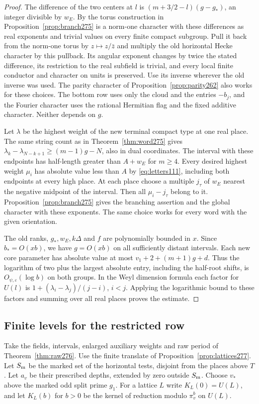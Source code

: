 \documentclass[a4paper,11pt]{article}
\theoremstyle{definition}
\theoremstyle{remark}
\numberwithin{equation}{section}
\begin{document}
\begin{proof}
The difference of the two centers at \(l\) is
\((m+3/2-l)(g-g_*)\), an integer divisible by \(w_E\).
By the torus construction in Proposition~\ref{prop:branch275} is a norm-one character with these differences as real
exponents and trivial values on every finite compact subgroup.
Pull it back from the norm-one torus by \(z\mapsto z/\bar z\)
and multiply the old horizontal Hecke character by this
pullback. Its angular exponent changes by twice the stated
difference, its restriction to the real subfield is trivial,
and every local finite conductor and character on units
is preserved. Use its inverse wherever the old inverse was
used. The parity character of Proposition~\ref{prop:parity262}
also works for these choices. The bottom row uses only the
cloud and the entries \(-b_j\), and the Fourier character
uses the rational Hermitian flag and the fixed additive
character. Neither depends on \(g\).

Let \(\lambda\) be the highest weight of the new terminal
compact type at one real place. The same string count as in
Theorem~\ref{thm:word275} gives
\(\lambda_k-\lambda_{N-k+1}\ge (m-1)g-N\), also in dual
coordinates. The interval with these endpoints has half-length
greater than \(A+w_E\) for \(m\ge4\). Every desired highest
weight \(\mu_i\) has absolute value less than \(A\) by
\eqref{eq:letters111}, including both endpoints at every high
place. At each place choose a multiple \(j_\tau\) of \(w_E\)
nearest the negative midpoint of the interval. Then all
\(\mu_i-j_\tau\) belong to it. Proposition~\ref{prop:branch275}
gives the branching assertion and the global character with
these exponents. The same choice works for every word with
the given orientation.

The old ranks, \(g_*,w_E,k\Delta\) and \(f\) are polynomially
bounded in \(x\). Since \(b_*=O(xb)\), we have \(g=O(xb)\)
on all sufficiently distant intervals. Each new core
parameter has absolute value at most
\(v_1+2+(m+1)g+d\). Thus the logarithm of two plus the
largest absolute entry, including the half-root shifts,
is \(O_{\psi,\varepsilon}(\log b)\) on both groups.
In the Weyl dimension formula each factor for \(U(l)\) is
\(1+(\lambda_i-\lambda_j)/(j-i)\), \(i<j\). Applying the
logarithmic bound to these factors and summing over all
real places proves the estimate.
\end{proof}

\subsection{Finite levels for the restricted row}\label{nav:V-44}
Take the fields, intervals, enlarged auxiliary weights and raw
period of Theorem~\ref{thm:raw276}. Use the finite translate
of Proposition~\ref{prop:lattices277}. Let \(S_{\rm m}\)
be the marked set of the horizontal tests, disjoint from the
places above \(T\). Let \(a_v\) be their prescribed depths,
extended by zero outside \(S_{\rm m}\). Choose \(v_*\) above
the marked odd split prime \(g_1\). For a lattice \(L\) write
\(K_L(0)=U(L)\), and let \(K_L(b)\) for \(b>0\) be the
kernel of reduction modulo \(\pi_v^b\) on \(U(L)\).
\end{document}
